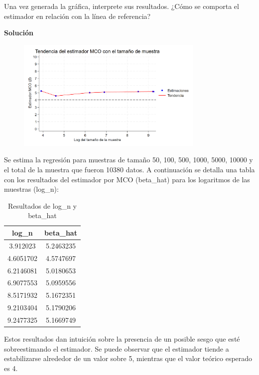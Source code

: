 \documentclass[a4paper, answers, addpoints, 11pt]{exam}
\begin{document}
\begin{itemize}
    Una vez generada la gráfica, interprete sus resultados. ¿Cómo se comporta el estimador en relación con la línea de referencia?
     \begin{mdframed}
        \textbf{Solución}
        \begin{figure}[H]  %
    \centering
    \includegraphics[width=0.8\textwidth]{output/figures/graficoconinter.png} 
    \label{fig:mi_grafico}
\end{figure}Se estima la regresión para muestras de tamaño 50, 100, 500, 1000, 5000, 10000  y el total de la muestra que fueron 10380 datos. A continuación se detalla una tabla con los resultados del estimador por MCO (beta\_hat) para los logaritmos de las muestras (log\_n): 
\begin{table}[H]
    \centering
    \caption{Resultados de log\_n y beta\_hat}
    \begin{tabular}{cc}
        \toprule
         \textbf{log\_n} & \textbf{beta\_hat} \\
        \midrule
        3.912023  & 5.2463235 \\
         4.6051702 & 4.5747697 \\
         6.2146081 & 5.0180653 \\
         6.9077553 & 5.0959556 \\
        8.5171932 & 5.1672351 \\
         9.2103404 & 5.1790206 \\
        9.2477325 & 5.1669749 \\
        \bottomrule
    \end{tabular}
    \label{tab:resultados}
\end{table}
Estos resultados dan intuición sobre la presencia de un posible sesgo que esté sobreestimando el estimador. Se puede observar que el estimador tiende a estabilizarse alrededor de un valor sobre 5, mientras que el valor teórico esperado es 4. 


\end{mdframed}
\end{itemize}
\end{document}
